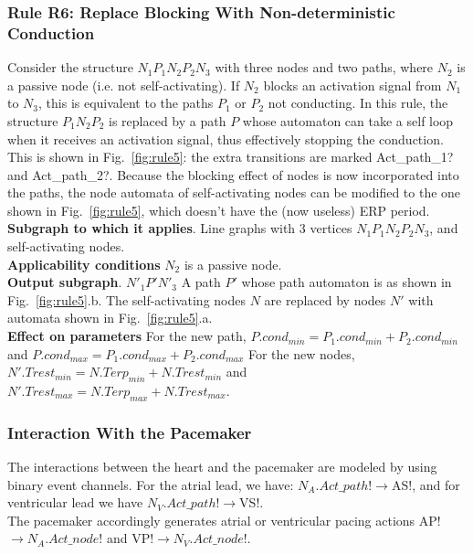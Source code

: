 \subsubsection{Rule R6: Replace Blocking With Non-deterministic Conduction}
Consider the structure $N_1 P_1 N_2 P_2 N_3$ with three nodes and two paths, where $N_2$ is a passive node (i.e. not self-activating).
If $N_2$ blocks an activation signal from $N_1$ to $N_3$, this is equivalent to the paths $P_1$ or $P_2$ not conducting.
In this rule, the structure $P_1 N_2 P_2$ is replaced by a path $P$ whose automaton can take a self loop when it receives an activation signal, thus effectively stopping the conduction. 
This is shown in Fig.~\ref{fig:rule5}: the extra transitions are marked Act\_path\_1? and Act\_path\_2?.
Because the blocking effect of nodes is now incorporated into the paths, the node automata of self-activating nodes can be modified to the one shown in Fig.~\ref{fig:rule5}, which doesn't have the (now useless) ERP period.
\\
\textbf{Subgraph to which it applies}.
Line graphs with 3 vertices $N_1 P_1 N_2 P_2 N_3$, and self-activating nodes.\\
\textbf{Applicability conditions}
$N_2$ is a passive node.\\
\textbf{Output subgraph}.
$N'_1 P' N'_3$
A path $P'$ whose path automaton is as shown in Fig.~\ref{fig:rule5}.b.
The self-activating nodes $N$ are replaced by nodes $N'$ with automata shown in Fig.~\ref{fig:rule5}.a.\\
\textbf{Effect on parameters}
For the new path, $P.cond_{min}=P_1.cond_{min}+P_2.cond_{min}$ and 
$P.cond_{max}=P_1.cond_{max}+P_2.cond_{max}$
For the new nodes, $N'.Trest_{min}=N.Terp_{min}+N.Trest_{min}$ and 
$N'.Trest_{max}=N.Terp_{max}+N.Trest_{max}$.\\
\subsubsection{Interaction With the Pacemaker}
The interactions between the heart and the pacemaker are modeled by using binary event channels. For the atrial lead, we have:
\textsf{$N_A.Act\_path!\rightarrow$AS!},
and for ventricular lead we have
\textsf{$N_V.Act\_path!\rightarrow$VS!}.\\
The pacemaker accordingly generates atrial or ventricular pacing actions \textsf{AP!$\rightarrow N_A.Act\_node!$} and \textsf{VP!$\rightarrow N_V.Act\_node!$}.